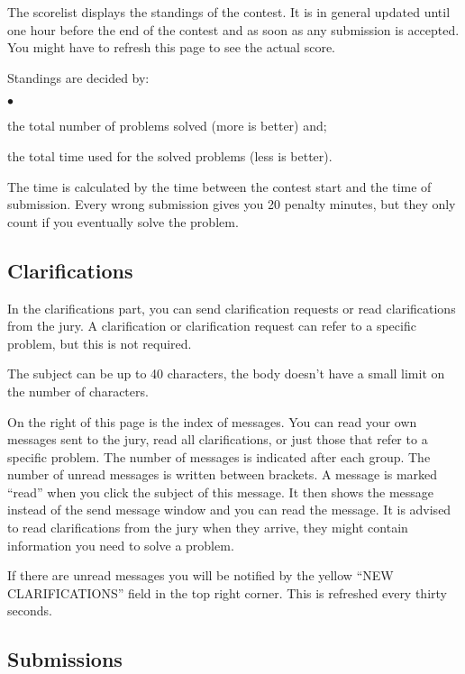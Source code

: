 \documentclass[a4paper]{artikel3}
\newenvironment{citemize}
  {\begin{list}{$\bullet$}{\topsep 0cm \itemsep 0cm}}
  {\end{list}}
\begin{document}
The scorelist displays the standings of the contest. It is in general
updated until one hour before the end of the contest and as soon as any
submission is accepted. You might have to refresh this page to see the
actual score.

Standings are decided by:

\begin{citemize}
\item the total number of problems solved (more is better) and;
\item the total time used for the solved problems (less is better).
\end{citemize}

The time is calculated by the time between the contest start and the time of
submission. Every wrong submission gives you 20 penalty minutes, but they
only count if you eventually solve the problem.

\vspace{-0.3cm}
\subsection{Clarifications}
\vspace{-0.2cm}

In the clarifications part, you can send clarification requests or read
clarifications from the jury. A clarification or clarification request can
refer to a specific problem, but this is not required.

The subject can be up to 40 characters, the body doesn't have a small
limit on the number of characters.

On the right of this page is the index of messages. You can read your own
messages sent to the jury, read all clarifications, or just those that refer
to a specific problem. The number of messages is indicated after each group.
The number of unread messages is written between brackets. A message is
marked ``read'' when you click the subject of this message. It then shows
the message instead of the send message window and you can read the message.
It is advised to read clarifications from the jury when they arrive, they
might contain information you need to solve a problem.

If there are unread messages you will be notified by the yellow ``NEW
CLARIFICATIONS'' field in the top right corner. This is refreshed every
thirty seconds.

\vspace{-0.3cm}
\subsection{Submissions}
\vspace{-0.2cm}
\end{document}
